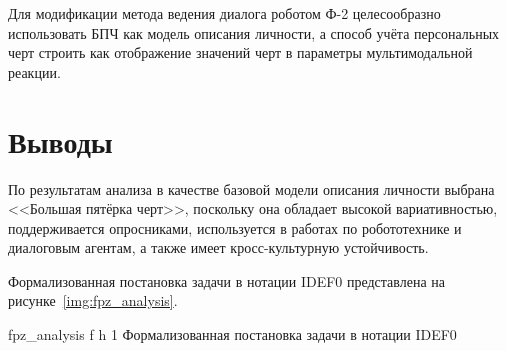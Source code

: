Для модификации метода ведения диалога роботом Ф-2 целесообразно использовать БПЧ как модель описания личности, а способ учёта персональных черт строить как отображение значений черт в параметры мультимодальной реакции.

\section*{Выводы}

По результатам анализа в качестве базовой модели описания личности выбрана <<Большая пятёрка черт>>, поскольку она обладает высокой вариативностью, поддерживается опросниками, используется в работах по робототехнике и диалоговым агентам, а также имеет кросс-культурную устойчивость.

Формализованная постановка задачи в нотации IDEF0 представлена на рисунке~\ref{img:fpz_analysis}. %

{fpz_analysis}
{f}
{h}
{1\textwidth}
{Формализованная постановка задачи в нотации IDEF0}
